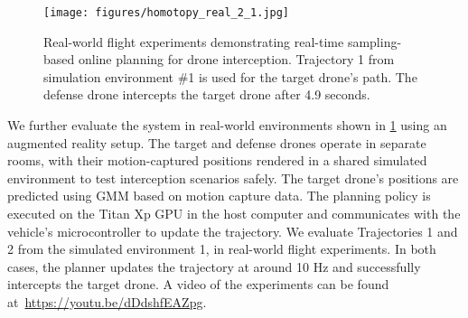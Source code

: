 \begin{figure}[]
    \centering
    \texttt{[image: figures/homotopy\_real\_2\_1.jpg]}
    \caption{Real-world flight experiments demonstrating real-time sampling-based online planning for drone interception. 
    Trajectory 1 from simulation environment \#1 is used for the target drone's path. 
    The defense drone intercepts the target drone after 4.9 seconds.}
    \label{fig:exp_real}
    \vspace{-1.3\baselineskip}
\end{figure}

We further evaluate the system in real-world environments shown in \cref{fig:exp_real} using an augmented reality setup.
The target and defense drones operate in separate rooms, with their motion-captured positions rendered in a shared simulated environment to test interception scenarios safely.
The target drone's positions are predicted using GMM based on motion capture data. 
The planning policy is executed on the Titan Xp GPU in the host computer and communicates with the vehicle's microcontroller to update the trajectory.
We evaluate Trajectories 1 and 2 from the simulated environment 1, in real-world flight experiments. 
In both cases, the planner updates the trajectory at around 10 Hz and successfully intercepts the target drone.
A video of the experiments can be found at~\url{https://youtu.be/dDdshfEAZpg}.
